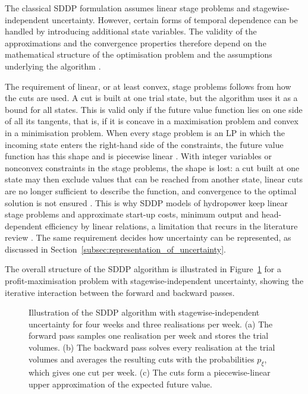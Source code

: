 The classical SDDP formulation assumes linear stage
problems and stagewise-independent uncertainty.
However, certain forms of temporal dependence can be
handled by introducing additional state variables.
The validity of the approximations and the convergence
properties therefore depend on the mathematical structure
of the optimisation problem and the assumptions underlying
the algorithm
\parencite[pp.~63--66]{shapiro2011}.

The requirement of linear, or at least convex, stage problems follows from how the cuts are used. A cut is built at one trial state, but the algorithm uses it as a bound for all states. This is valid only if the future value function lies on one side of all its tangents, that is, if it is concave in a maximisation problem and convex in a minimisation problem. When every stage problem is an LP in which the incoming state enters the right-hand side of the constraints, the future value function has this shape and is piecewise linear \parencite[pp.~361--363]{pereiraPinto1991}. With integer variables or nonconvex constraints in the stage problems, the shape is lost: a cut built at one state may then exclude values that can be reached from another state, linear cuts are no longer sufficient to describe the function, and convergence to the optimal solution is not ensured \parencites[p.~369]{pereiraPinto1991}[p.~506]{fullnerRebennack2025}. This is why SDDP models of hydropower keep linear stage problems and approximate start-up costs, minimum output and head-dependent efficiency by linear relations, a limitation that recurs in the literature review \parencite{helseth2013, helseth2016, hjelmeland2019energies}. The same requirement decides how uncertainty can be represented, as discussed in Section~\ref{subsec:representation_of_uncertainty}.

The overall structure of the SDDP algorithm is illustrated
in Figure~\ref{fig:sddp_original} for a profit-maximisation problem with stagewise-independent uncertainty, showing the iterative
interaction between the forward and backward passes.

\begin{figure}[H]
\centering
\caption{Illustration of the SDDP algorithm with stagewise-independent
uncertainty for four weeks and three realisations per week.
(a) The forward pass samples one realisation per week
and stores the trial volumes.
(b) The backward pass solves every realisation at the trial volumes
and averages the resulting cuts with the probabilities $p_\xi$,
which gives one cut per week.
(c) The cuts form a piecewise-linear upper approximation
of the expected future value.}
\label{fig:sddp_original}
\end{figure}

